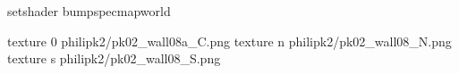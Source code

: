 setshader bumpspecmapworld

texture 0 philipk2/pk02_wall08a_C.png
texture n philipk2/pk02_wall08_N.png
texture s philipk2/pk02_wall08_S.png

